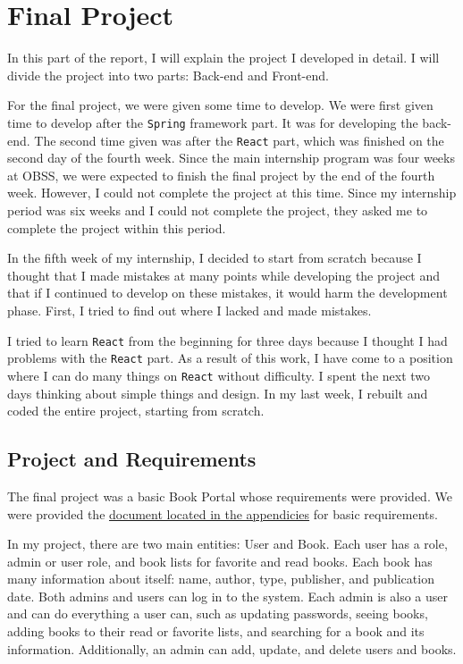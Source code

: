 \section{Final Project}
\label{final-project}

In this part of the report, I will explain the project I developed in detail. I will divide the project into two parts: Back-end and Front-end.

For the final project, we were given some time to develop. We were first given time to develop after the \texttt{Spring} framework part. It was for developing the back-end. The second time given was after the \texttt{React} part, which was finished on the second day of the fourth week. Since the main internship program was four weeks at OBSS, we were expected to finish the final project by the end of the fourth week. However, I could not complete the project at this time. Since my internship period was six weeks and I could not complete the project, they asked me to complete the project within this period.

In the fifth week of my internship, I decided to start from scratch because I thought that I made mistakes at many points while developing the project and that if I continued to develop on these mistakes, it would harm the development phase. First, I tried to find out where I lacked and made mistakes.

I tried to learn \texttt{React} from the beginning for three days because I thought I had problems with the \texttt{React} part. As a result of this work, I have come to a position where I can do many things on \texttt{React} without difficulty. I spent the next two days thinking about simple things and design. In my last week, I rebuilt and coded the entire project, starting from scratch.

\subsection{Project and Requirements}

The final project was a basic Book Portal whose requirements were provided. We were provided the \hyperref[book-portal]{document located in the appendicies} for basic requirements.

In my project, there are two main entities: User and Book. Each user has a role, admin or user role, and book lists for favorite and read books. Each book has many information about itself: name, author, type, publisher, and publication date. Both admins and users can log in to the system. Each admin is also a user and can do everything a user can, such as updating passwords, seeing books, adding books to their read or favorite lists, and searching for a book and its information. Additionally, an admin can add, update, and delete users and books.




